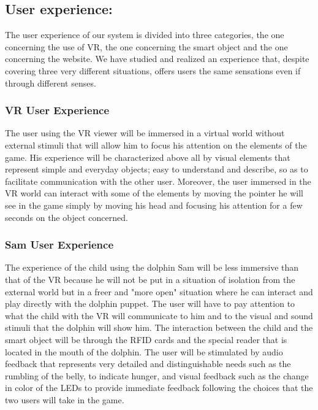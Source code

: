 \documentclass [12pt]{article}
\begin{document}
\subsection{User experience:}
The user experience of our system is divided into three categories, the one concerning the use of VR, the one concerning the smart object and the one concerning the website. 
We have studied and realized an experience that, despite covering three very different situations, offers users the same sensations even if through different senses.
\subsubsection{VR User Experience}
The user using the VR viewer will be immersed in a virtual world without external stimuli that will allow him to focus his attention on the elements of the game. His experience will be characterized above all by visual elements that represent simple and everyday objects; easy to understand and describe, so as to facilitate communication with the other user. 
Moreover, the user immersed in the VR world can interact with some of the elements by moving the pointer he will see in the game simply by moving his head and focusing his attention for a few seconds on the object concerned.
\subsubsection{Sam User Experience}
The experience of the child using the dolphin Sam will be less immersive than that of the VR because he will not be put in a situation of isolation from the external world but in a freer and "more open" situation where he can interact and play directly with the dolphin puppet. The user will have to pay attention to what the child with the VR will communicate to him and to the visual and sound stimuli that the dolphin will show him. The interaction between the child and the smart object will be through the RFID cards and the special reader that is located in the mouth of the dolphin. The user will be stimulated by audio feedback that represents very detailed and distinguishable needs such as the rumbling of the belly, to indicate hunger, and visual feedback such as the change in color of the LEDs to provide immediate feedback following the choices that the two users will take in the game.
\end{document}
